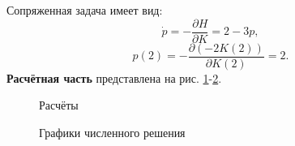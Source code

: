 \documentclass[a4paper, 12pt]{article}
\newcommand{\df}[2]{\frac{\partial #1}{\partial #2}}
\begin{document}
Сопряженная задача имеет вид:
\begin{equation}
    \dot p = -\df{H}{K}=2-3p,
\end{equation}
\begin{equation}
    p(2)=-\df{(-2K(2))}{K(2)}=2.
\end{equation}
{\bf Расчётная часть} представлена на рис. \ref{11beg}-\ref{11end}.
\begin{figure}[h]
    \noindent{}
    \caption{Расчёты}
    \label{11beg}
\end{figure}
\begin{figure}[h]
    \noindent{}
    \caption{Графики численного решения}
    \label{11end}
\end{figure} 
\end{document}
